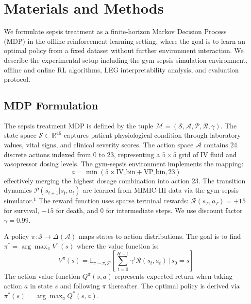 
\section{Materials and Methods}\label{sec:methods}

We formulate sepsis treatment as a finite-horizon Markov Decision Process (MDP) in the offline reinforcement learning setting, where the goal is to learn an optimal policy from a fixed dataset without further environment interaction. We describe the experimental setup including the gym-sepsis simulation environment, offline and online RL algorithms, LEG interpretability analysis, and evaluation protocol.

\subsection{MDP Formulation}\label{sec:methods:mdp}

The sepsis treatment MDP is defined by the tuple $\mathcal{M} = (\mathcal{S}, \mathcal{A}, \mathcal{P}, \mathcal{R}, \gamma)$. The state space $\mathcal{S} \subset \mathbb{R}^{46}$ captures patient physiological condition through laboratory values, vital signs, and clinical severity scores. The action space $\mathcal{A}$ contains 24 discrete actions indexed from 0 to 23, representing a $5 \times 5$ grid of IV fluid and vasopressor dosing levels. The gym-sepsis environment implements the mapping:
\begin{equation}
a = \min(5 \times \text{IV\_bin} + \text{VP\_bin}, 23)
\end{equation}
effectively merging the highest dosage combination into action 23. The transition dynamics $\mathcal{P}(s_{t+1} | s_t, a_t)$ are learned from MIMIC-III data via the gym-sepsis simulator.$^{1}$ The reward function uses sparse terminal rewards: $\mathcal{R}(s_T, a_T) = +15$ for survival, $-15$ for death, and $0$ for intermediate steps. We use discount factor $\gamma = 0.99$.

A policy $\pi: \mathcal{S} \to \Delta(\mathcal{A})$ maps states to action distributions. The goal is to find $\pi^* = \arg\max_\pi V^\pi(s)$ where the value function is:
\begin{equation}
V^\pi(s) = \mathbb{E}_{\tau \sim \pi, \mathcal{P}} \left[ \sum_{t=0}^{H-1} \gamma^t \mathcal{R}(s_t, a_t) \,\Big|\, s_0 = s \right]
\end{equation}
The action-value function $Q^\pi(s, a)$ represents expected return when taking action $a$ in state $s$ and following $\pi$ thereafter. The optimal policy is derived via $\pi^*(s) = \arg\max_a Q^*(s, a)$.


